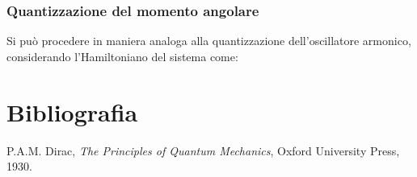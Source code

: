 \documentclass{article}
\begin{document}
\subsubsection{Quantizzazione del momento angolare}
Si può procedere in maniera analoga alla quantizzazione dell'oscillatore armonico, considerando l'Hamiltoniano del sistema come:




\section{Bibliografia}
\begin{thebibliography}{9}
     P.A.M. Dirac, \emph{The Principles of Quantum Mechanics}, Oxford University Press, 1930.
\end{thebibliography}
\end{document}
